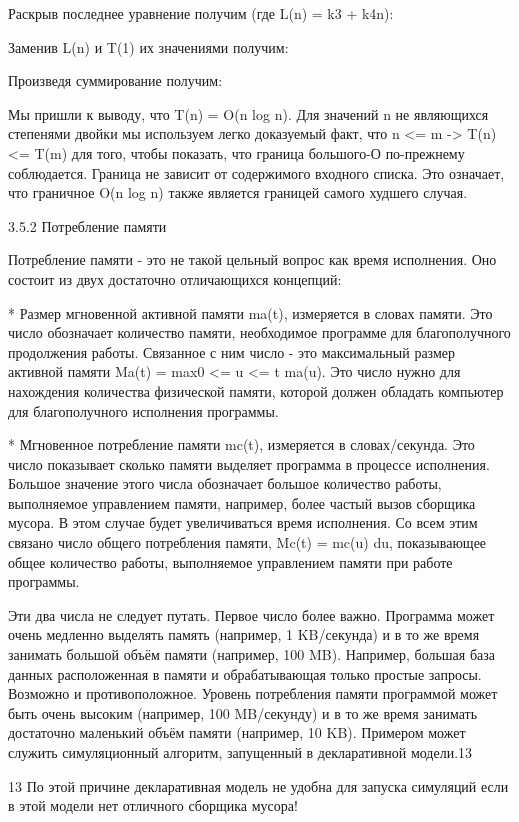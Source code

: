 Раскрыв последнее уравнение получим (где L(n) = k3 + k4n):

Заменив L(n) и T(1) их значениями получим:

Произведя суммирование получим:

Мы пришли к выводу, что T(n) = O(n log n). Для значений n не являющихся степенями двойки мы используем легко доказуемый факт, что n <= m -> T(n) <= T(m) для того, чтобы показать, что граница большого-О по-прежнему соблюдается. Граница не зависит от содержимого входного списка. Это означает, что граничное O(n log n) также является границей самого худшего случая.

3.5.2 Потребление памяти

Потребление памяти - это не такой цельный вопрос как время исполнения. Оно состоит из двух достаточно отличающихся концепций:

* Размер мгновенной активной памяти ma(t), измеряется в словах памяти. Это число обозначает количество памяти, необходимое программе для благополучного продолжения работы. Связанное с ним число - это максимальный размер активной памяти Ma(t) = max0 <= u <= t ma(u). Это число нужно для нахождения количества физической памяти, которой должен обладать компьютер для благополучного исполнения программы.

* Мгновенное потребление памяти mc(t), измеряется в словах/секунда. Это число показывает сколько памяти выделяет программа в процессе исполнения. Большое значение этого числа обозначает большое количество работы, выполняемое управлением памяти, например, более частый вызов сборщика мусора. В этом случае будет увеличиваться время исполнения. Со всем этим связано число общего потребления памяти, Mc(t) = mc(u) du, показывающее общее количество работы, выполняемое управлением памяти при работе программы.

Эти два числа не следует путать. Первое число более важно. Программа может очень медленно выделять память (например, 1 KB/секунда) и в то же время занимать большой объём памяти (например, 100 MB). Например, большая база данных расположенная в памяти и обрабатывающая только простые запросы. Возможно и противоположное. Уровень потребления памяти программой может быть очень высоким (например, 100 MB/секунду) и в то же время занимать достаточно маленький объём памяти (например, 10 KB). Примером может служить симуляционный алгоритм, запущенный в декларативной модели.13

13 По этой причине декларативная модель не удобна для запуска симуляций если в этой модели нет отличного сборщика мусора!

